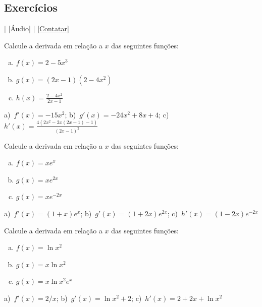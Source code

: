 \subsection*{Exercícios}

\begin{flushright}
  [Vídeo] | [Áudio] | \href{https://phkonzen.github.io/notas/contato.html}{[Contatar]}
\end{flushright}

\begin{exer}
  Calcule a derivada em relação a $x$ das seguintes funções:
  \begin{enumerate}[a)]
  \item $f(x) = 2 - 5x^3$ \\
  \item $g(x) = (2x-1)(2-4x^2)$
  \item $h(x) = \frac{2-4x^2}{2x-1}$
  \end{enumerate}
\end{exer}
\begin{resp}
  a)~$f'(x) = -15x^2$; b)~$g'(x)=- 24 x^{2} + 8 x + 4$; c)~$\displaystyle h'(x) = \frac{4 \left(2 x^{2} - 2 x \left(2 x - 1\right) - 1\right)}{\left(2 x - 1\right)^{2}}$
\end{resp}

\begin{exer}
  Calcule a derivada em relação a $x$ das seguintes funções:
  \begin{enumerate}[a)]
  \item $f(x) = xe^x$
  \item $g(x) = xe^{2x}$
  \item $g(x) = xe^{-2x}$
  \end{enumerate}
\end{exer}
\begin{resp}
  a)~$f'(x) = (1+x)e^x$; b)~$g'(x) = (1+2x)e^{2x}$; c)~$h'(x) = (1-2x)e^{-2x}$
\end{resp}

\begin{exer}
  Calcule a derivada em relação a $x$ das seguintes funções:
  \begin{enumerate}[a)]
  \item $f(x) = \ln x^2$
  \item $g(x) = x\ln x^2$
  \item $g(x) = x\ln x^2e^x$
  \end{enumerate}
\end{exer}
\begin{resp}
  a)~$f'(x) = 2/x$; b)~$g'(x) = \ln x^2 + 2$; c)~$h'(x) = 2+2x+\ln x^2$
\end{resp}

